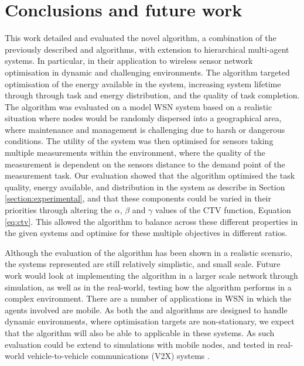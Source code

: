 \section{Conclusions and future work}
\label{section:conclusions}

This work detailed and evaluated the novel \acronymWSNOptimisation{}{} algorithm, a combination of the previously described \acronymATARIA{}{} and \acronymMGRAO{}{} algorithms, with extension to hierarchical multi-agent systems. In particular, in their application to wireless sensor network optimisation in dynamic and challenging environments. The algorithm targeted optimisation of the energy available in the system, increasing system lifetime through through task and energy distribution, and the quality of task completion. The algorithm was evaluated on a model WSN system based on a realistic situation where nodes would be randomly dispersed into a geographical area, where maintenance and management is challenging due to harsh or dangerous conditions. The utility of the system was then optimised for sensors taking multiple measurements within the environment, where the quality of the measurement is dependent on the sensors distance to the demand point of the measurement task. Our evaluation showed that the \acronymWSNOptimisation{}{} algorithm optimised the task quality, energy available, and distribution in the system as describe in Section \ref{section:experimental}, and that these components could be varied in their priorities through altering the $\alpha$, $\beta$ and $\gamma$ values of the CTV function, Equation \ref{eq:ctv}. This allowed the algorithm to balance across these different properties in the given systems and optimise for these multiple objectives in different ratios. 

Although the evaluation of the algorithm has been shown in a realistic scenario, the systems represented are still relatively simplistic, and small scale. Future work would look at implementing the algorithm in a larger scale network through simulation, as well as in the real-world, testing how the algorithm performs in a complex environment. There are a number of applications in WSN in which the agents involved are mobile. As both the \acronymATARIA{}{} and \acronymMGRAO{}{} algorithms are designed to handle dynamic environments, where optimisation targets are non-stationary, we expect that the \acronymWSNOptimisation{}{} algorithm will also be able to applicable in these systems. As such evaluation could be extend to simulations with mobile nodes, and tested in real-world vehicle-to-vehicle communications (V2X) systems \citep{Gupta2017, Tong2019}.


  